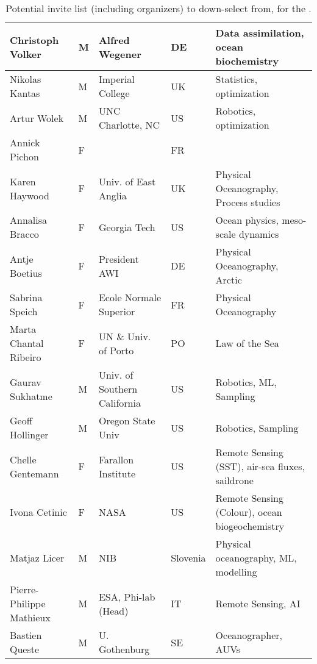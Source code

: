 \begin{table}[]
{\begin{tabular}{|p{3cm}|p{0.5cm}|p{3.5cm}|p{1cm}|p{4cm}|}
\hline
Christoph Volker         & M   & Alfred Wegener                        & DE       & Data assimilation, ocean biochemistry           \\
\hline
Nikolas Kantas           & M   & Imperial College                      & UK       & Statistics, optimization                        \\
\hline
Artur Wolek              & M   & UNC Charlotte, NC                     & US       & Robotics, optimization                          \\
\hline
Annick Pichon            & F   &                                       & FR       &                                                 \\
\hline
Karen Haywood            & F   & Univ. of East Anglia                  & UK       & Physical Oceanography, Process studies          \\
\hline
Annalisa Bracco          & F   & Georgia Tech                          & US       & Ocean physics, meso-scale dynamics              \\
\hline
Antje Boetius            & F   & President AWI                         & DE       & Physical Oceanography, Arctic                   \\
\hline
Sabrina Speich           & F   & Ecole Normale Superior                & FR       & Physical Oceanography                           \\
\hline
Marta Chantal Ribeiro    & F   & UN \& Univ. of Porto                  & PO       & Law of the Sea                                  \\
\hline
Gaurav Sukhatme          & M   & Univ. of Southern California          & US       & Robotics, ML, Sampling                          \\
\hline
Geoff Hollinger          & M   & Oregon State Univ                     & US       & Robotics, Sampling                              \\
\hline
Chelle Gentemann         & F   & Farallon Institute                    & US       & Remote Sensing (SST), air-sea fluxes, saildrone \\
\hline
Ivona Cetinic            & F   & NASA                                  & US       & Remote Sensing (Colour), ocean biogeochemistry  \\
\hline
Matjaz Licer             & M   & NIB                                   & Slovenia & Physical oceanography, ML, modelling            \\
\hline
Pierre-Philippe Mathieux & M   & ESA, Phi-lab (Head)                   & IT       & Remote Sensing, AI                              \\
\hline
Bastien Queste           & M   & U. Gothenburg                         & SE       & Oceanographer, AUVs\\                            
\hline
\end{tabular}
}
  \caption{Potential invite list (including organizers) to down-select from, for the \sympe.}
  \label{tab:part}
\end{table}

